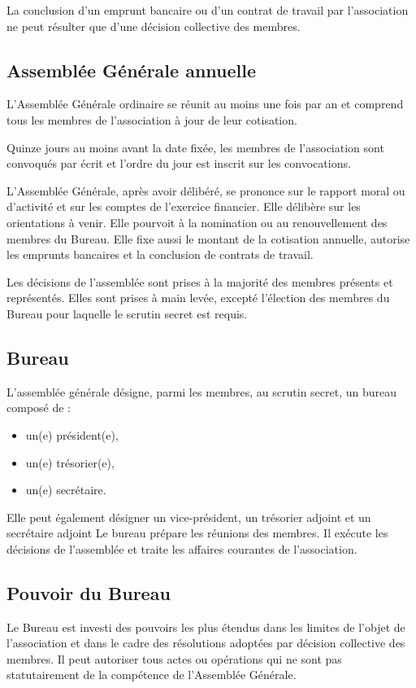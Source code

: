 \documentclass[a4paper,french,10pt]{article}
\begin{document}
La conclusion d’un emprunt bancaire ou d’un contrat de travail par
l’association ne peut résulter que d’une décision collective des
membres.

\subsection{Assemblée Générale annuelle}
\label{sec:ago}
L’Assemblée Générale ordinaire se réunit au moins une fois par an et
comprend tous les membres de l’association à jour de leur cotisation.

Quinze jours au moins avant la date fixée, les membres de
l’association sont convoqués par écrit et l’ordre du jour est inscrit
sur les convocations.

L’Assemblée Générale, après avoir délibéré, se prononce sur le rapport
moral ou d’activité et sur les comptes de l’exercice financier. Elle
délibère sur les orientations à venir. Elle pourvoit à la nomination
ou au renouvellement des membres du Bureau. Elle fixe aussi le montant
de la cotisation annuelle, autorise les emprunts bancaires et la
conclusion de contrats de travail.

Les décisions de l’assemblée sont prises à la majorité des membres
présents et représentés. Elles sont prises à main levée, excepté
l'élection des membres du Bureau pour laquelle le scrutin secret est
requis.



\subsection{Bureau}
\label{sec:bureau}
L’assemblée générale désigne, parmi les membres, au scrutin secret, un
bureau composé de :
\begin{itemize}
\item un(e) président(e),
  
\item un(e) trésorier(e),

\item un(e) secrétaire.
\end{itemize}

Elle peut également désigner un vice-président, un trésorier adjoint
et un secrétaire adjoint Le bureau prépare les réunions des
membres. Il exécute les décisions de l’assemblée et traite les
affaires courantes de l’association.



\subsection{Pouvoir du Bureau}
\label{sec:pouvoirs}
Le Bureau est investi des pouvoirs les plus étendus dans les limites
de l’objet de l’association et dans le cadre des résolutions adoptées
par décision collective des membres. Il peut autoriser tous actes ou
opérations qui ne sont pas statutairement de la compétence de
l’Assemblée Générale.
\end{document}
